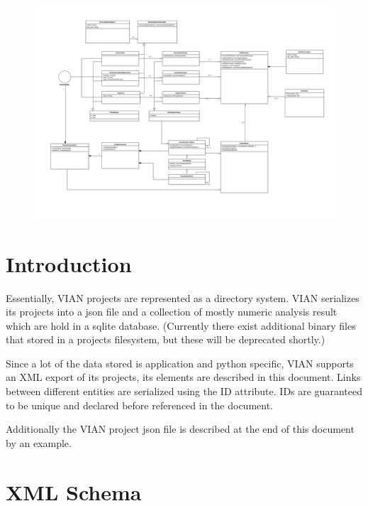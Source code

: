 \documentclass[11pt, a4paper,oneside,chapterprefix=false]{scrbook}
\begin{document}
\begin{landscape}
	\begin{figure}[htp]
		\centering
		\includegraphics[width = 1.5\textwidth]{figures/VIAN_DataModel_simplified.pdf}
		\label{fig:vian_classobj}
	\end{figure}
\end{landscape}

\section{Introduction}
Essentially, VIAN projects are represented as a directory system. VIAN serializes its projects into a json file and a collection of mostly numeric analysis result which are hold in a sqlite database. (Currently there exist additional binary files that stored in a projects filesystem, but these will be deprecated shortly.)



Since a lot of the data stored is application and python specific, VIAN supports an XML export of its projects, its elements are described in this document. Links between different entities are serialized using the ID attribute. IDs are guaranteed to be unique and declared before referenced in the document.

Additionally the VIAN project json file is described at the end of this document by an example.



\section{XML Schema}
\end{document}
